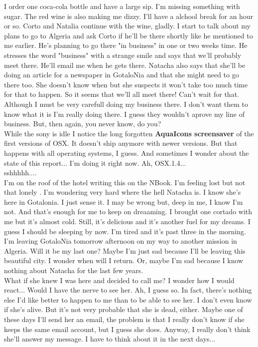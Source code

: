 \documentclass[11pt,twoside,a4paper]{book}
\begin{document}
\begin{multicols*}{2}
    I order one coca-cola bottle and have a large sip. I'm missing something with sugar. The red wine is also making me dizzy. I'll have a alchool break for an hour or so. Corto and Natalia continue with the wine, gladly. I start to talk about my plans to go to Algeria and ask Corto if he'll be there shortly like he mentioned to me earlier. He's planning to go there "in business" in one or two weeks time. He stresses the word "business" with a strange smile and says that we'll probably meet there. He'll email me when he gets there. Natacha also says that she'll be doing an article for a newspaper in GotaloNia and that she might need to go there too. She doesn't know when but she suspects it won't take too much time for that to happen. So it seems that we'll all meet there! Can't wait for that. Although I must be very carefull doing my business there. I don't want them to know what it is I'm really doing there. I guess they wouldn't aprove my line of business. But, then again, you never know, do you? ~\\

    While the sony is idle I notice the long forgotten \textbf{AquaIcons screensaver} of the first versions of OSX. It doesn't ship anymore with newer versions. But that happens with all operating systems, I guess. And sometimes I wonder about the state of this report... I'm doing it right now. Ah, OSX.1.4... ~\\

    {\small sshhhhh....} ~\\

    I'm on the roof of the hotel writing this on the NBook. I'm feeling lost but not that lonely . I'm wondering very hard where the hell Natacha is. I know she's here in Gotalonia. I just sense it. I may be wrong but, deep in me, I know I'm not. And that's enough for me to keep on dreaaming. I brought one cortado with me but it's almost cold. Still, it's delicious and it's another fuel for my dreams. I guess I should be sleeping by now. I'm tired and it's past three in the morning. I'm leaving GotaloNia tomorrow afternoon on my way to another mission in Algeria. Will it be my last one? Maybe I'm just sad because I'll be leaving this beautiful city. I wonder when will I return. Or, maybe I'm sad because I know nothing about Natacha for the last few years. ~\\

    What if she knew I was here and decided to call me? I wonder how I would react... Would I have the nerve to see her. Ah, I guess so. In fact, there's nothing else I'd like better to happen to me than to be able to see her. I don't even know if she's alive. But it's not very probable that she is dead, either. Maybe one of these days I'll send her an email, the problem is that I really don't know if she keeps the same email account, but I guess she does. Anyway, I really don't think she'll answer my message. I have to think about it in the next days... ~\\


\end{multicols*}
\end{document}
